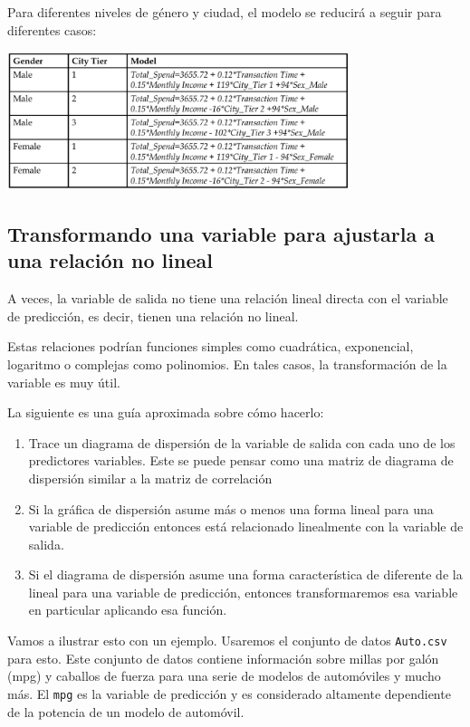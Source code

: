 Para diferentes niveles de género y ciudad, el modelo se reducirá a seguir para
diferentes casos:
\begin{center}
	\includegraphics[width=10cm,keepaspectratio=true]{./images/dummies.png}
\end{center}



\subsection{Transformando una variable para ajustarla a una relación no lineal}

A veces, la variable de salida no tiene una relación lineal directa con el
variable de predicción, es decir, tienen una relación no lineal.


Estas relaciones podrían
funciones simples como cuadrática, exponencial, logaritmo o complejas como
polinomios. En tales casos, la transformación de la variable es muy útil.


La siguiente es una guía aproximada sobre cómo hacerlo:
\begin{enumerate}
	\item
	Trace un diagrama de dispersión de la variable de salida con cada uno de los predictores
	variables. Este se puede pensar como una matriz de diagrama de dispersión similar a
	la matriz de correlación
	\item Si la gráfica de dispersión asume más o menos una forma lineal para una variable de predicción
	entonces está relacionado linealmente con la variable de salida.
	\item Si el diagrama de dispersión asume una forma característica de diferente de la lineal para una variable de predicción, entonces transformaremos esa variable en particular
	aplicando esa función.
\end{enumerate}


Vamos a ilustrar esto con un ejemplo. Usaremos el conjunto de datos \texttt{Auto.csv} para esto.
Este conjunto de datos contiene información sobre millas por galón (mpg) y caballos de fuerza para
una serie de modelos de automóviles y mucho más. El \texttt{mpg} es la variable de predicción y es
considerado altamente dependiente de la potencia de un modelo de automóvil.

